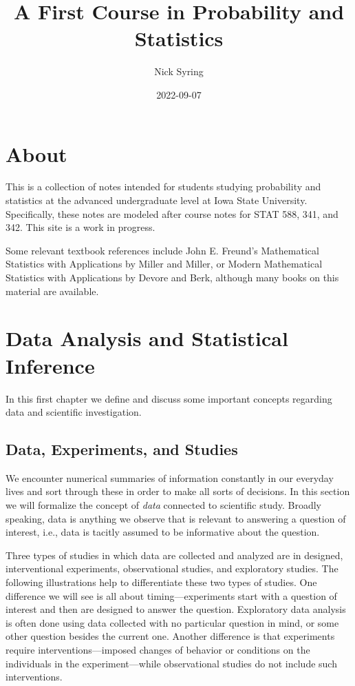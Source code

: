 \documentclass[
]{book}
\title{A First Course in Probability and Statistics}
\author{Nick Syring}
\date{2022-09-07}
\begin{document}
\maketitle

{
\setcounter{tocdepth}{1}
\tableofcontents
}
\hypertarget{about}{%
\chapter{About}\label{about}}

This is a collection of notes intended for students studying probability and statistics at the advanced undergraduate level at Iowa State University. Specifically, these notes are modeled after course notes for STAT 588, 341, and 342. This site is a work in progress.

Some relevant textbook references include John E. Freund's Mathematical Statistics with Applications by Miller and Miller, or Modern Mathematical Statistics with Applications by Devore and Berk, although many books on this material are available.

\hypertarget{data-analysis-and-statistical-inference}{%
\chapter{Data Analysis and Statistical Inference}\label{data-analysis-and-statistical-inference}}

In this first chapter we define and discuss some important concepts regarding data and scientific investigation.

\hypertarget{data-experiments-and-studies}{%
\section{Data, Experiments, and Studies}\label{data-experiments-and-studies}}

We encounter numerical summaries of information constantly in our everyday lives and sort through these in order to make all sorts of decisions. In this section we will formalize the concept of \emph{data} connected to scientific study. Broadly speaking, data is anything we observe that is relevant to answering a question of interest, i.e., data is tacitly assumed to be informative about the question.

Three types of studies in which data are collected and analyzed are in designed, interventional experiments, observational studies, and exploratory studies. The following illustrations help to differentiate these two types of studies. One difference we will see is all about timing---experiments start with a question of interest and then are designed to answer the question. Exploratory data analysis is often done using data collected with no particular question in mind, or some other question besides the current one. Another difference is that experiments require interventions---imposed changes of behavior or conditions on the individuals in the experiment---while observational studies do not include such interventions.
\end{document}
